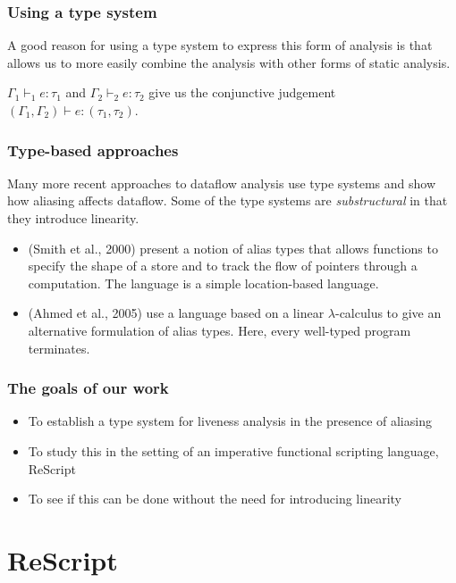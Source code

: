 \documentclass[aspectratio=169]{beamer}
\begin{document}
\begin{frame}
  \frametitle{Using a type system}

  A good reason for using a type system to express this form of
  analysis is that allows us to more easily combine the analysis with
  other forms of static analysis.

  $\Gamma_1 \vdash_1 e : \tau_1$ and $\Gamma_2 \vdash_2 e : \tau_2$
  give us the conjunctive judgement $(\Gamma_1,\Gamma_2) \vdash e :
  (\tau_1,\tau_2)$.
  
\end{frame}

\begin{frame}
  \frametitle{Type-based approaches}

  Many more recent approaches to dataflow analysis use type systems
  and show how aliasing affects dataflow. Some of the type systems are
  \emph{substructural} in that they introduce linearity.
  
  \begin{itemize}
  \item (Smith et al., 2000) present a notion of alias types that allows
    functions to specify the shape of a store and to track the flow of
    pointers through a computation. The language is a simple
    location-based language.
  \item (Ahmed et al., 2005) use a language based on a linear
    $\lambda$-calculus to give an alternative formulation of alias
    types. Here, every well-typed program terminates.
  \end{itemize}
\end{frame}

\begin{frame}
  \frametitle{The goals of our work}

  \begin{itemize}
  \item To establish a type system for liveness analysis in the
    presence of aliasing
  \item To study this in the setting of an imperative functional
    scripting language, ReScript
  \item To see if this can be done without the need for introducing linearity
  \end{itemize}
\end{frame}

\section{ReScript}
\end{document}
